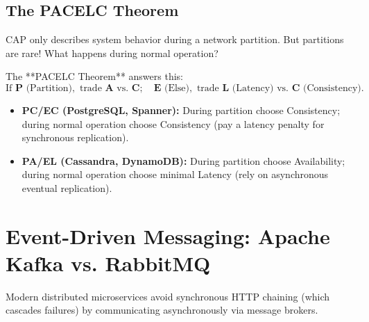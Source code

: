 \documentclass[10pt,journal,compsoc,onecolumn]{IEEEtran}
\begin{document}
\subsection{The PACELC Theorem}
CAP only describes system behavior during a network partition. But partitions are rare! What happens during normal operation?

The **PACELC Theorem** answers this:
$$\text{If } \mathbf{P} \text{ (Partition)}, \text{ trade } \mathbf{A} \text{ vs. } \mathbf{C}; \quad \mathbf{E} \text{ (Else)}, \text{ trade } \mathbf{L} \text{ (Latency) vs. } \mathbf{C} \text{ (Consistency)}.$$
\begin{itemize}
    \item \textbf{PC/EC (PostgreSQL, Spanner):} During partition choose Consistency; during normal operation choose Consistency (pay a latency penalty for synchronous replication).
    \item \textbf{PA/EL (Cassandra, DynamoDB):} During partition choose Availability; during normal operation choose minimal Latency (rely on asynchronous eventual replication).
\end{itemize}

\section{Event-Driven Messaging: Apache Kafka vs. RabbitMQ}
\label{sec:kafka}

Modern distributed microservices avoid synchronous HTTP chaining (which cascades failures) by communicating asynchronously via message brokers.
\end{document}
